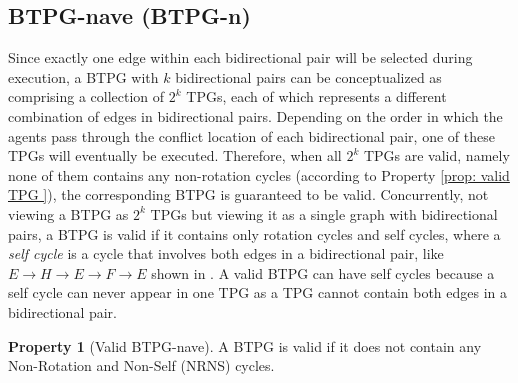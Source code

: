 \documentclass[letterpaper]{article}
\theoremstyle{definition}
\newtheorem{property}{Property}
\begin{document}
\subsection{BTPG-nave (BTPG-n)}
Since exactly one edge within each bidirectional pair will be selected during execution, a BTPG with $k$ bidirectional pairs can be conceptualized as comprising a collection of $2^k$ TPGs, each of which represents a different combination of edges in bidirectional pairs. Depending on the order in which the agents pass through the conflict location of each bidirectional pair, one of these TPGs will eventually be executed. Therefore, when all $2^k$ TPGs are valid, namely none of them contains any non-rotation cycles (according to Property \ref{prop: valid TPG }), the corresponding BTPG is guaranteed to be valid. Concurrently, not viewing a BTPG as $2^k$ TPGs but viewing it as a single graph with bidirectional pairs, a BTPG is valid if it contains only rotation cycles and self cycles, where a \emph{self cycle} is a cycle that involves both edges in a bidirectional pair, like $E\rightarrow H \rightarrow E \rightarrow F \rightarrow E$ shown in . A valid BTPG can have self cycles because a self cycle can never appear in one TPG as a TPG cannot contain both edges in a bidirectional pair.

\begin{property}[Valid BTPG-nave]
\label{prop: valid BTPG - naive}
A BTPG is valid if it does not contain any Non-Rotation and Non-Self (NRNS) cycles.
\end{property}
\end{document}
